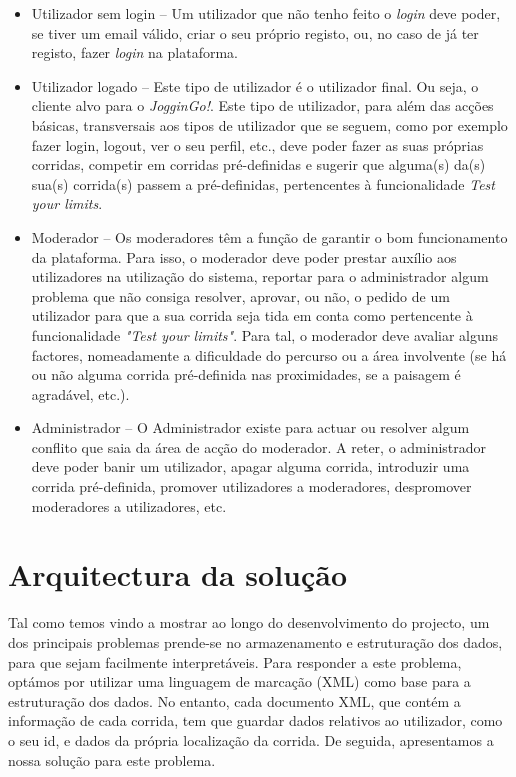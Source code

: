 \documentclass[twocolumn,twoside,10pt,a4paper]{article}
\begin{document}
\begin{itemize}
\item {Utilizador sem login} -- Um utilizador que não tenho feito o \textit{login} deve poder, se tiver um email válido, criar o seu próprio registo, ou, no caso de já ter registo, fazer \textit{login} na plataforma.
\item {Utilizador logado} -- Este tipo de utilizador é o utilizador final. Ou seja, o cliente alvo para o \textit{JogginGo!}. Este tipo de utilizador, para além das acções básicas, transversais aos tipos de utilizador que se seguem, como por exemplo fazer login, logout, ver o seu perfil, etc., deve poder fazer as suas próprias corridas, competir em corridas pré-definidas e sugerir que alguma(s) da(s) sua(s) corrida(s) passem a pré-definidas, pertencentes à funcionalidade \textit{Test your limits}.
\item{Moderador} -- Os moderadores têm a função de garantir o bom funcionamento da plataforma. Para isso, o moderador deve poder prestar auxílio aos utilizadores na utilização do sistema, reportar para o administrador algum problema que não consiga resolver, aprovar, ou não, o pedido de um utilizador para que a sua corrida seja tida em conta como pertencente à funcionalidade \textit{"Test your limits"}. Para tal, o moderador deve avaliar alguns factores, nomeadamente a dificuldade do percurso ou a área involvente (se há ou não alguma corrida pré-definida nas proximidades, se a paisagem é agradável, etc.).
\item{Administrador} -- O Administrador existe para actuar ou resolver algum conflito que saia da área de acção do moderador. A reter, o administrador deve poder banir um utilizador, apagar alguma corrida, introduzir uma corrida pré-definida, promover utilizadores a moderadores, despromover moderadores a utilizadores, etc.
\end{itemize}

\section{Arquitectura da solução}
Tal como temos vindo a mostrar ao longo do desenvolvimento do projecto, um dos principais problemas prende-se no armazenamento e estruturação dos dados, para que sejam facilmente interpretáveis. Para responder a este problema, optámos por utilizar uma linguagem de marcação (XML) como base para a estruturação dos dados. No entanto, cada documento XML, que contém a informação de cada corrida, tem que guardar dados relativos ao utilizador, como o seu id, e dados da própria localização da corrida. De seguida, apresentamos a nossa solução para este problema.
\end{document}
